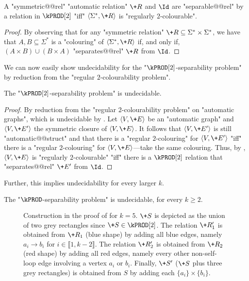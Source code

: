 \begin{corollary}\AP\label{cor:2reg-2prod}
    A "symmetric@@rel" "automatic relation" $\+R$ and $\Id$ are "separable@@rel" by a relation in $\kPROD[2]$ "iff" $\tup{\Sigma^*,\+R}$ is "regularly $2$-colourable".
\end{corollary}

\begin{proof}
    By observing that for any "symmetric relation" $\+R \subseteq \Sigma^* \times \Sigma^*$, we have that $A,B \subseteq \Sigma^*$ is a "colouring" of $\tup{\Sigma^*,\+R}$ if, and only if, $(A \times B) \cup (B \times A)$ "separates@@rel" $\+R$ from $\Id$.
\end{proof}

We can now easily show undecidability for the "$\kPROD[2]$-separability problem" by reduction from the "regular $2$-colourability problem".
\begin{lemma}\AP\label{lem:aut-2prod-sep-undec}
    The "$\kPROD[2]$-separability problem" is undecidable.
\end{lemma}
\begin{proof}
    By reduction from the "regular $2$-colourability problem" on "automatic graphs", which is undecidable by . Let $\tup{V,\+E}$ be an "automatic graph" and $\tup{V,\+E'}$ the symmetric closure of $\tup{V,\+E}$. It follows that $\tup{V,\+E'}$ is still "automatic@@struct" and that there is a "regular $2$-colouring" for $\tup{V,\+E'}$ "iff" there is a "regular $2$-colouring" for $\tup{V,\+E}$---take the same colouring.
    Thus, by , $\tup{V,\+E}$ is "regularly $2$-colourable" "iff" 
    there is a $\kPROD[2]$ relation that "separates@@rel" $\+E'$ from $\Id$.
\end{proof}

Further, this implies undecidability for every larger $k$.
\begin{proposition}
    \AP\label{prop:kprod-undecidable}
    The "$\kPROD$-separability problem" is undecidable, for every $k \geq 2$.
\end{proposition}

\begin{figure}
    \centering
    \begin{tikzpicture}
        
    \end{tikzpicture}
    \caption{
        \AP\label{fig:2prod-to-kprod}
        Construction in the proof of  for $k = 5$. $\+S$ is depicted as the union of two grey rectangles since $\+S \in \kPROD[2]$.
        The relation $\+R'_1$ is obtained from $\+R_1$ (blue shape) by adding all blue edges,
        namely $a_i \to b_i$ for $i \in \lBrack 1, k-2\rBrack$. The relation $\+R'_2$ is obtained from $\+R_2$ (red shape) by adding
        all red edges, namely every other non-self-loop edge involving a vertex $a_i$ or $b_i$.
        Finally, $\+S'$ ($\+S$ plus three grey rectangles) is obtained from $S$ by adding
        each $\{a_i\} \times \{b_i\}$.
    }
\end{figure}


